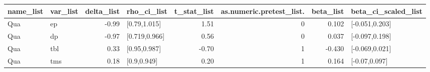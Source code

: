 \begin{table}[ht]
\centering
\begin{tabular}{llrlrrrl}
  \hline
name\_list & var\_list & delta\_list & rho\_ci\_list & t\_stat\_list & as.numeric.pretest\_list. & beta\_list & beta\_ci\_scaled\_list \\ 
  \hline
Qua & ep & -0.99 & [0.79,1.015] & 1.51 & 0 & 0.102 & [-0.051,0.203] \\ 
  Qua & dp & -0.97 & [0.719,0.966] & 0.56 & 0 & 0.037 & [-0.097,0.198] \\ 
  Qua & tbl & 0.33 & [0.95,0.987] & -0.70 & 1 & -0.430 & [-0.069,0.021] \\ 
  Qua & tms & 0.18 & [0.9,0.949] & 0.20 & 1 & 0.164 & [-0.07,0.097] \\ 
   \hline
\end{tabular}
\end{table}
